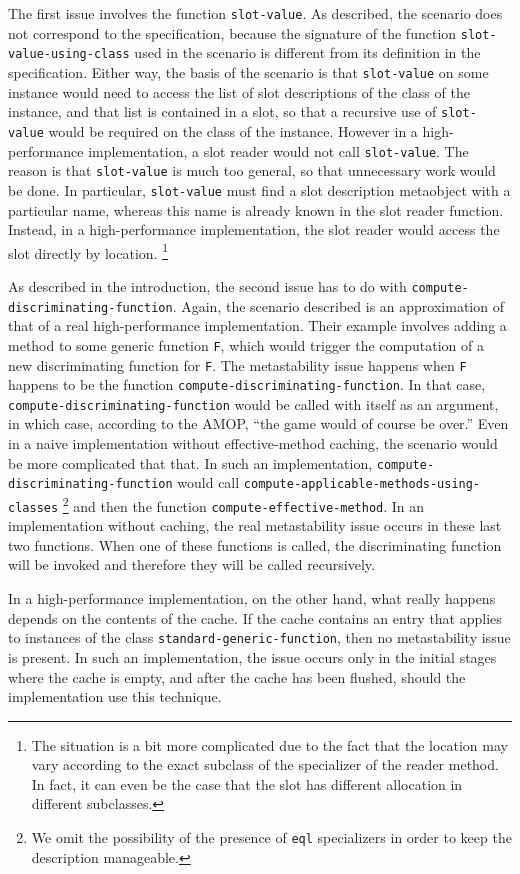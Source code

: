 The first issue involves the function \texttt{slot-value}.  As
described, the scenario does not correspond to the specification,
because the signature of the function \texttt{slot-value-using-class}
used in the scenario is different from its definition in the
specification.  Either way, the basis of the scenario is that
\texttt{slot-value} on some instance would need to access the list of
slot descriptions of the class of the instance, and that list is
contained in a slot, so that a recursive use of \texttt{slot-value}
would be required on the class of the instance.  However in a
high-performance implementation, a slot reader would not call
\texttt{slot-value}.  The reason is that \texttt{slot-value} is much
too general, so that unnecessary work would be done.  In particular, 
\texttt{slot-value} must find a slot description metaobject with a
particular name, whereas this name is already known in the slot
reader function.  Instead, in a high-performance implementation, the
slot reader would access the slot directly by location.%
\footnote{The situation is a bit more complicated due to the fact that
  the location may vary according to the exact subclass of the
  specializer of the reader method.  In fact, it can even be the case
  that the slot has different allocation in different subclasses.}

As described in the introduction, the second issue has to do with
\texttt{compute-discriminating-function}.  Again, the scenario
described is an approximation of that of a real high-performance
implementation.  Their example involves adding a method to some
generic function \texttt{F}, which would trigger the computation of a
new discriminating function for \texttt{F}.  The metastability issue
happens when \texttt{F} happens to be the function
\texttt{compute-discriminating-function}.  In that case,
\texttt{compute-discriminating-function} would be called with itself
as an argument, in which case, according to the AMOP, ``the game would
of course be over.''  Even in a naive implementation without
effective-method caching, the scenario would be more complicated that
that.  In such an implementation,
\texttt{compute-discriminating-function} would call 
\texttt{compute-applicable-methods-using-classes}%
\footnote{We omit the possibility of the presence of \texttt{eql}
  specializers in order to keep the description manageable.}
and then the function \texttt{compute-effective-method}.  In an
implementation without caching, the real metastability issue occurs in
these last two functions.  When one of these functions is called, the
discriminating function will be invoked and therefore they will be
called recursively.  

In a high-performance implementation, on the other hand, what really
happens depends on the contents of the cache.  If the cache contains
an entry that applies to instances of the class
\texttt{standard-generic-function}, then no metastability issue is
present.  In such an implementation, the issue occurs only in the
initial stages where the cache is empty, and after the cache has been
flushed, should the implementation use this technique. 



